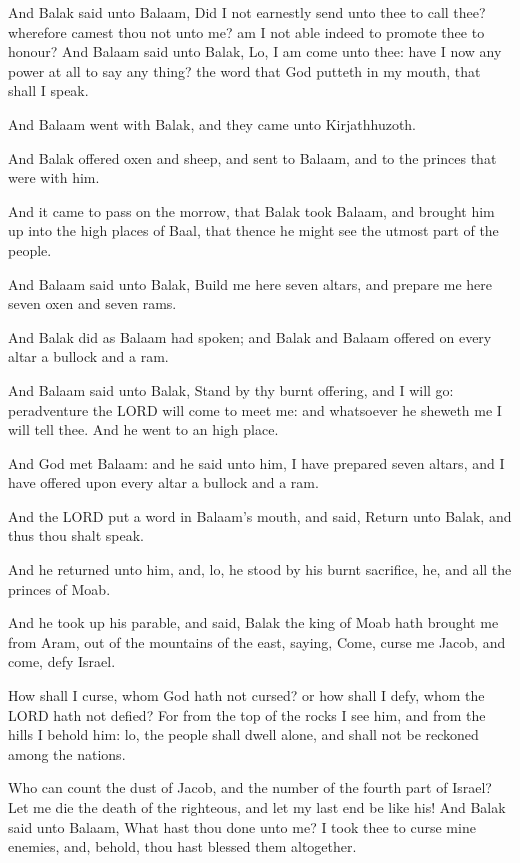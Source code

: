 \Verse And Balak said unto Balaam, Did I not earnestly send unto thee
to call thee? wherefore camest thou not unto me? am I not able indeed
to promote thee to honour?  \Verse And Balaam said unto Balak, Lo, I am
come unto thee: have I now any power at all to say any thing? the word
that God putteth in my mouth, that shall I speak.

\Verse And Balaam went with Balak, and they came unto Kirjathhuzoth.

\Verse And Balak offered oxen and sheep, and sent to Balaam, and to the
princes that were with him.

\Verse And it came to pass on the morrow, that Balak took Balaam, and
brought him up into the high places of Baal, that thence he might see
the utmost part of the people.


\Chapter
\Verse And Balaam said unto Balak, Build me here seven altars, and
prepare me here seven oxen and seven rams.

\Verse And Balak did as Balaam had spoken; and Balak and Balaam offered
on every altar a bullock and a ram.

\Verse And Balaam said unto Balak, Stand by thy burnt offering, and I
will go: peradventure the LORD will come to meet me: and whatsoever he
sheweth me I will tell thee. And he went to an high place.

\Verse And God met Balaam: and he said unto him, I have prepared seven
altars, and I have offered upon every altar a bullock and a ram.

\Verse And the LORD put a word in Balaam's mouth, and said, Return unto
Balak, and thus thou shalt speak.

\Verse And he returned unto him, and, lo, he stood by his burnt
sacrifice, he, and all the princes of Moab.

\Verse And he took up his parable, and said, Balak the king of Moab hath
brought me from Aram, out of the mountains of the east, saying, Come,
curse me Jacob, and come, defy Israel.

\Verse How shall I curse, whom God hath not cursed? or how shall I defy,
whom the LORD hath not defied?  \Verse For from the top of the rocks I
see him, and from the hills I behold him: lo, the people shall dwell
alone, and shall not be reckoned among the nations.

\Verse Who can count the dust of Jacob, and the number of the fourth
part of Israel? Let me die the death of the righteous, and let my last
end be like his!  \Verse And Balak said unto Balaam, What hast thou
done unto me? I took thee to curse mine enemies, and, behold, thou
hast blessed them altogether.

